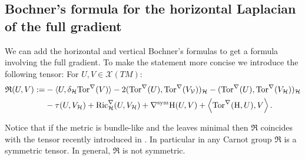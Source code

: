 \documentclass[11pt]{article}
\numberwithin{equation}{section}
\newcommand{\Ho}{\mathcal H}
\newcommand{\V}{\mathcal V}
\begin{document}
    \subsection{Bochner's formula for the horizontal Laplacian of the full gradient}

    We can add the horizontal and vertical Bochner's formulas to get a formula involving the full gradient. To make the statement more concise we introduce the following tensor: For $U,V \in \mathcal{X}(TM)$:
    \begin{align}
\mathfrak{R}(U,V):=&-\langle U, \delta_\Ho \mathrm{Tor}^\nabla ( V ) \rangle-2 (\mathrm{Tor}^\nabla (U),\mathrm{Tor}^\nabla (V_\V ) )_\Ho -(\mathrm{Tor}^\nabla (U),\mathrm{Tor}^\nabla (V_\Ho ) )_\Ho  \notag \\
            &-\tau(U,V_\Ho)+\mathrm{Ric}^\nabla_\Ho(U ,V_\Ho )+ \nabla^{\mathrm{sym}}\mathrm H(U,V)+\left\langle \mathrm{Tor}^\nabla (\mathrm H, U), V \right\rangle.
    \end{align}
    
Notice that if the metric is bundle-like and the leaves minimal then $\mathfrak{R}$ coincides with the tensor recently introduced in \cite{2025arXiv250913276B}. In particular in any Carnot group $\mathfrak{R}$ is a symmetric tensor. In general, $\mathfrak{R}$ is not symmetric.
\end{document}
